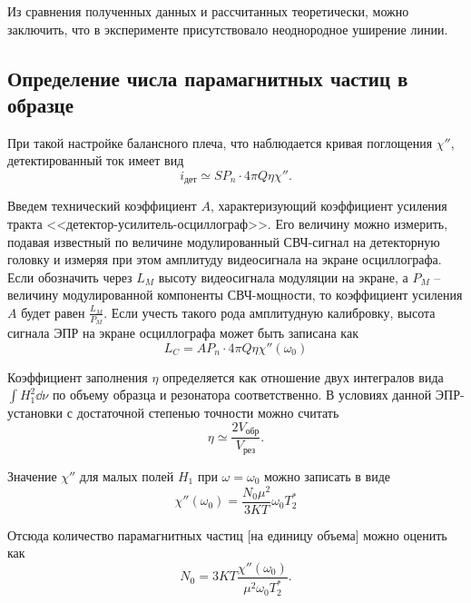\documentclass[a4paper,14pt]{extarticle}
\begin{document}
Из сравнения полученных данных и рассчитанных теоретически, можно заключить, что в эксперименте присутствовало неоднородное уширение линии. 

\subsection{Определение числа парамагнитных частиц в образце}

При такой настройке балансного плеча, что наблюдается кривая поглощения $\chi''$, детектированный ток имеет вид \cite[стр. 33]{mar}
\begin{equation}
    \label{eq:15}
    i_{\text{дет}} \simeq S P_n \cdot 4 \pi Q \eta \chi''.
\end{equation}

Введем технический коэффициент $A$, характеризующий коэффициент усиления тракта <<детектор-усилитель-осциллограф>>. Его величину можно измерить, подавая известный по величине модулированный СВЧ-сигнал на детекторную головку и измеряя при этом амплитуду видеосигнала на экране осциллографа. Если обозначить через  $L_M$ высоту видеосигнала модуляции 
на экране, а $P_M$ -- величину модулированной компоненты СВЧ-мощности, то коэффициент усиления $A$ будет равен  $\frac{L_M}{P_M}$. Если учесть такого рода амплитудную калибровку, высота сигнала ЭПР на экране осциллографа может быть записана как
\begin{equation}
    \label{eq:16}
    L_{C} = A P_n \cdot 4 \pi Q \eta \chi''(\omega_{0})
\end{equation}

Коэффициент заполнения $\eta$ определяется как отношение  двух интегралов вида  $\int H_{1}^2 \dd{\nu}$ по объему образца и резонатора соответственно. В условиях данной ЭПР-установки
с достаточной степенью точности можно считать 
\begin{equation}
    \label{eq:17}
    \eta \simeq \frac{2 V_{\text{обр}}}{V_{\text{рез}}}.
\end{equation}

Значение $\chi''$ для малых полей  $H_{1}$ при $\omega = \omega_{0}$ можно записать в виде
\begin{equation}
    \label{eq:18}
    \chi '' (\omega_{0}) = \frac{N_{0} \mu^2}{3KT} \omega_{0} T_2^*
\end{equation}

Отсюда количество парамагнитных частиц [на единицу объема] можно оценить как
\begin{equation}
    \label{eq:20}
    N_0 = 3KT \frac{\chi''(\omega_{0})}{\mu^2 \omega_0 T_2^*}.
\end{equation}
\end{document}
